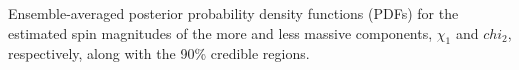 \label{fig:spinPDF} Ensemble-averaged posterior probability density functions (PDFs) for the estimated spin magnitudes of the more and less massive components, $\chi_1$ and $chi_2$, respectively, along with the 90\% credible regions.